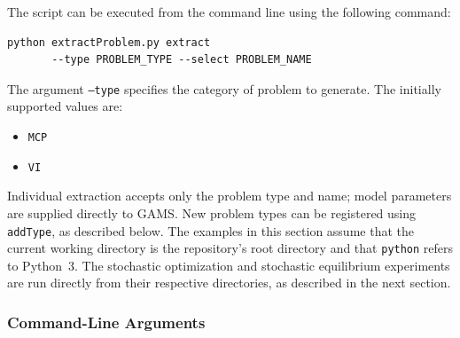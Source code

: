 The script can be executed from the command line using the following command:

\begin{verbatim}
python extractProblem.py extract 
       --type PROBLEM_TYPE --select PROBLEM_NAME
\end{verbatim}

The argument \texttt{--type} specifies the category of problem to generate. The initially supported values are:

\begin{itemize}
    \item \texttt{MCP}
    \item \texttt{VI}
\end{itemize}

Individual extraction accepts only the problem type and name; model parameters are supplied directly to GAMS. New problem types can be registered using \texttt{addType}, as described below. The examples in this section assume that the current working directory is the repository's root directory and that \texttt{python} refers to Python~3. The stochastic optimization and stochastic equilibrium experiments are run directly from their respective directories, as described in the next section.

\subsubsection{Command-Line Arguments}

